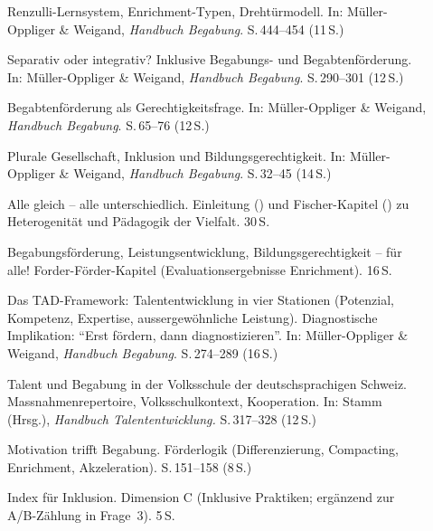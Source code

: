 \documentclass[ngerman, a4paper]{article}
\begin{document}
\begin{description}
  \item[\cite{renzullireis2021rls}] Renzulli-Lernsystem, Enrichment-Typen,
    Drehtürmodell. In: Müller-Oppliger \& Weigand, \textit{Handbuch Begabung}.
    S.\,444--454 (11\,S.)
  \item[\cite{weigand2021separativ}] Separativ oder integrativ? Inklusive
    Begabungs- und Begabtenförderung.
    In: Müller-Oppliger \& Weigand, \textit{Handbuch Begabung}.
    S.\,290--301 (12\,S.)
  \item[\cite{sedmak2021bildungsgerechtigkeit}] Begabtenförderung als
    Gerechtigkeitsfrage. In: Müller-Oppliger \& Weigand,
    \textit{Handbuch Begabung}. S.\,65--76 (12\,S.)
  \item[\cite{muelleroppliger2021plurale}] Plurale Gesellschaft, Inklusion
    und Bildungsgerechtigkeit. In: Müller-Oppliger \& Weigand,
    \textit{Handbuch Begabung}. S.\,32--45 (14\,S.)
  \item[\cite{buholzer2010allegleich}] Alle gleich -- alle unterschiedlich.
    Einleitung (\cite{buholzerkummerwyss2010einfuehrung}) und Fischer-Kapitel
    (\cite{fischer2010begabung}) zu Heterogenität und Pädagogik der Vielfalt.
    30\,S.
  \item[\cite{fischer2020begabungsfoerderung}] Begabungsförderung,
    Leistungsentwicklung, Bildungsgerechtigkeit -- für alle!
    Forder-Förder-Kapitel (Evaluationsergebnisse Enrichment). 16\,S.
  \item[\cite{preckel2021tad}] Das TAD-Framework: Talententwicklung in vier
    Stationen (Potenzial, Kompetenz, Expertise, aussergewöhnliche Leistung).
    Diagnostische Implikation: \enquote{Erst fördern, dann diagnostizieren}.
    In: Müller-Oppliger \& Weigand, \textit{Handbuch Begabung}.
    S.\,274--289 (16\,S.)
  \item[\cite{grossenbacher2014integrative}] Talent und Begabung in der
      Volksschule der deutschsprachigen Schweiz. Massnahmenrepertoire,
      Volksschulkontext, Kooperation.
      In: Stamm (Hrsg.), \textit{Handbuch Talententwicklung.}
      S.\,317--328 (12\,S.)
  \item[\cite{lehwald2017motivation}] Motivation trifft Begabung.
      Förderlogik (Differenzierung, Compacting, Enrichment, Akzeleration).
      S.\,151--158 (8\,S.)
  \item[\cite{booth2019index}] Index für Inklusion. Dimension C
    (Inklusive Praktiken; ergänzend zur A/B-Zählung in Frage~3). 5\,S.
\end{description}
 
\end{document}
